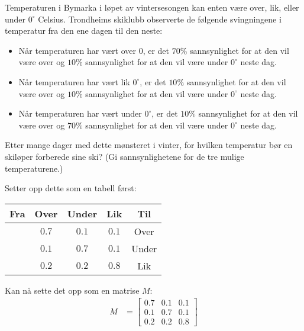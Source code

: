 \documentclass[11pt, a4paper, norsk]{NTNUoving}
\begin{document}
   \begin{oppgave}
       Temperaturen i Bymarka i løpet av vintersesongen kan enten være over, lik, eller under $0^{\circ}$ Celsius. Trondheims skiklubb observerte de følgende svingningene i temperatur fra den ene dagen til den neste:

       \begin{itemize}
           \item Når temperaturen har vært over $0$, er det $70\%$ sannsynlighet for at den vil være over og $10\%$ sannsynlighet for at den vil være under $0^{\circ}$ neste dag.
           \item Når temperaturen har vært lik $0^{\circ}$, er det $10\%$ sannsynlighet for at den vil være over og $10\%$ sannsynlighet for at den vil være under $0^{\circ}$ neste dag.
           \item Når temperaturen har vært under $0^{\circ}$, er det $10\%$ sannsynlighet for at den vil være over og $70\%$ sannsynlighet for at den vil være under $0^{\circ}$ neste dag.
       \end{itemize}
       Etter mange dager med dette mønsteret i vinter, for hvilken temperatur bør en skiløper forberede sine ski? (Gi sannsynlighetene for de tre mulige temperaturene.)

       
       Setter opp dette som en tabell først:
       \begin{table}[htpb]
           \centering
           \begin{tabular}{c|c|c|c|c}
               Fra & Over & Under & Lik & Til \\
               \hline
                   & $0.7$ & $0.1$ & $0.1$ & Over \\
                   & $0.1$ & $0.7$ & $0.1$ & Under \\
                   & $0.2$ & $0.2$ & $0.8$ & Lik
           \end{tabular}
       \end{table}
       
       Kan nå sette det opp som en matrise $M$:
       \begin{align*}
           M &= \begin{bmatrix}
               0.7 & 0.1 & 0.1 \\
               0.1 & 0.7 & 0.1 \\
               0.2 & 0.2 & 0.8
           \end{bmatrix}
       \end{align*}
       

\end{oppgave}
\end{document}
